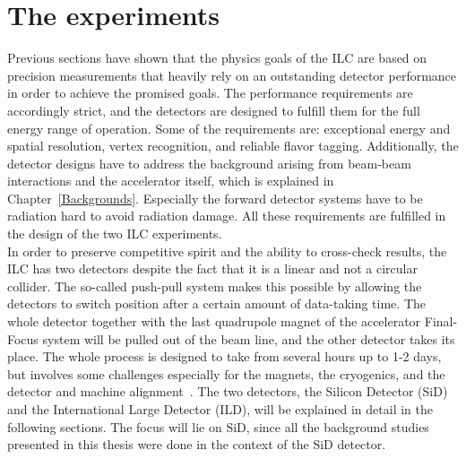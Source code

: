 \section{The experiments}
\label{ILC:detectors}
Previous sections have shown that the physics goals of the ILC are based on precision measurements that heavily rely on an outstanding detector performance in order to achieve the promised goals.
The performance requirements are accordingly strict, and the detectors are designed to fulfill them for the full energy range of operation.
Some of the requirements are: exceptional energy and spatial resolution, vertex recognition, and reliable flavor tagging.
Additionally, the detector designs have to address the background arising from beam-beam interactions and the accelerator itself, which is explained in Chapter~\ref{Backgrounds}.
Especially the forward detector systems have to be radiation hard to avoid radiation damage.
All these requirements are fulfilled in the design of the two ILC experiments.
\\In order to preserve competitive spirit and the ability to cross-check results, the ILC has two detectors despite the fact that it is a linear and not a circular collider.
The so-called push-pull system makes this possible by allowing the detectors to switch position after a certain amount of data-taking time.
The whole detector together with the last quadrupole magnet of the accelerator Final-Focus system will be pulled out of the beam line, and the other detector takes its place.
The whole process is designed to take from several hours up to 1-2 days, but involves some challenges especially for the magnets, the cryogenics, and the detector and machine alignment~\cite[p. 28-29]{TDR1}.
The two detectors, the Silicon Detector (SiD) and the International Large Detector (ILD), will be explained in detail in the following sections.
The focus will lie on SiD, since all the background studies presented in this thesis were done in the context of the SiD detector.

